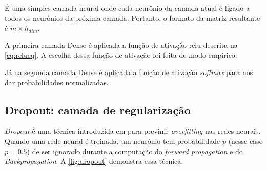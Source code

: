 É uma simples camada neural onde cada neurônio da camada atual é ligado a todos os neurônios da próxima camada. Portanto, o formato da matriz resultante é $m \times h_{dim}$. 

A primeira camada Dense é aplicada a função de ativação \ac{relu} descrita na \autoref{eq:relueq}. A escolha dessa função de ativação foi feita de modo empírico.

Já na segunda camada Dense é aplicada a função de ativação \textit{softmax} para nos dar probabilidades normalizadas.

\subsection{Dropout: camada de regularização}

\textit{Dropout} é uma técnica introduzida em \cite{srivastava2014dropout} para previnir \textit{overfitting} nas redes neurais. Quando uma rede neural é treinada, um neurônio tem probabilidade $p$ (nesse caso $p=0.5$) de ser ignorado durante a computação do \textit{forward propagation} e do \textit{Backpropagation}. A \autoref{fig:dropout} demonstra essa técnica. 

